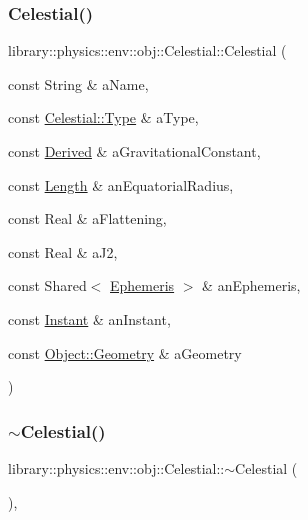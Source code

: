 \subsubsection{\texorpdfstring{Celestial()}{Celestial()}\hspace{0.1cm}{\footnotesize\ttfamily [2/2]}}
{\footnotesize\ttfamily library\+::physics\+::env\+::obj\+::\+Celestial\+::\+Celestial (\begin{DoxyParamCaption}\item[{const String \&}]{a\+Name,  }\item[{const \hyperlink{classlibrary_1_1physics_1_1env_1_1obj_1_1_celestial_aab1f58aa727e639288d65f3d33c4f245}{Celestial\+::\+Type} \&}]{a\+Type,  }\item[{const \hyperlink{classlibrary_1_1physics_1_1units_1_1_derived}{Derived} \&}]{a\+Gravitational\+Constant,  }\item[{const \hyperlink{classlibrary_1_1physics_1_1units_1_1_length}{Length} \&}]{an\+Equatorial\+Radius,  }\item[{const Real \&}]{a\+Flattening,  }\item[{const Real \&}]{a\+J2,  }\item[{const Shared$<$ \hyperlink{classlibrary_1_1physics_1_1env_1_1_ephemeris}{Ephemeris} $>$ \&}]{an\+Ephemeris,  }\item[{const \hyperlink{classlibrary_1_1physics_1_1time_1_1_instant}{Instant} \&}]{an\+Instant,  }\item[{const \hyperlink{classlibrary_1_1physics_1_1env_1_1_object_abdf50733c7ad97327fb64edca5670f13}{Object\+::\+Geometry} \&}]{a\+Geometry }\end{DoxyParamCaption})}

\mbox{\label{classlibrary_1_1physics_1_1env_1_1obj_1_1_celestial_a508a59c34ac23a582f2fed6003c4c907}} 
\subsubsection{\texorpdfstring{$\sim$\+Celestial()}{~Celestial()}}
{\footnotesize\ttfamily library\+::physics\+::env\+::obj\+::\+Celestial\+::$\sim$\+Celestial (\begin{DoxyParamCaption}{ }\end{DoxyParamCaption})\hspace{0.3cm}{\ttfamily [override]}, {\ttfamily [virtual]}}



